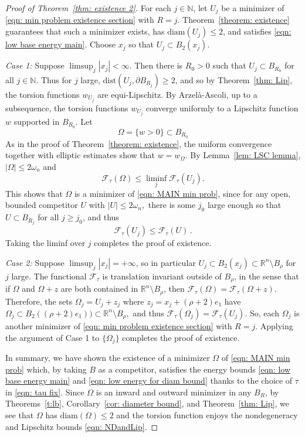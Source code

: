 \documentclass[10pt, reqno]{amsart}
\numberwithin{equation}{section}
\def\R{{\mathbb R}}
\def\W{\Omega}
\def\om{\omega}
\def\err{\tau}
\def\Ep{\mathcal{F}_{\err}}
\begin{document}
    \begin{proof}[Proof of Theorem~\ref{thm: existence 2}]
For each $j \in \mathbb{N}$, let $U_j$ be a minimizer of \eqref{eqn: min problem existence section} with $R =j.$ Theorem~\ref{theorem: existence} guarantees that such a minimizer exists, has  $\text{diam}(U_j)\leq 2$, and satisfies \eqref{eqn: low base energy main}. Choose $x_j$ so that $U_j \subset B_2(x_j).$

{\it Case 1:} Suppose $\limsup_j |x_j| <\infty$. Then there is  $R_0>0$ such that $U_j \subset B_{R_0}$ for all $j \in \mathbb{N}.$ Thus for $j$ large, $\text{dist}(U_j, \partial B_{R_j}) \geq 2$, and so by Theorem~\ref{thm: Lip}, the torsion functions $w_{U_j}$ are equi-Lipschitz. By Arzel\`{a}-Ascoli, up to a subsequence, the torsion functions $w_{U_j}$ converge uniformly to a Lipschitz function $w$ supported in $B_{R_0}$. Let 
\[
\W  =\{w>0\} \subset B_{R_0}
\]
 As in the proof of Theorem~\ref{theorem: existence}, the uniform convergence together with elliptic estimates show that $w= w_\W.$ By Lemma~\ref{lem: LSC lemma},  $|\W| \leq 2 \om_n$ and 
 \[
 \Ep(\W) \leq \liminf_j \Ep(U_j).
 \]
 This shows that $\W$ is a minimizer of \eqref{eqn: MAIN min prob}, since for any open, bounded competitor $U$ with $|U|\leq 2\om_n,$ there is some $j_0$ large enough so that $U \subset B_{R_j}$ for all $j \geq j_0$, and thus 
 \[
 \Ep(U_j) \leq \Ep(U)\,.
 \]
 Taking the liminf over $j$ completes the proof of existence.



 {\it Case 2:} Suppose $\limsup_j |x_j| = +\infty$, so  in particular $U_j \subset B_2(x_j) \subset \R^n \setminus B_\rho$  for $j$ large. The functional $\Ep$ is translation invariant outside of $B_\rho$, in the sense that if $\W$ and $\W + z$ are both contained in $\R^n \setminus B_\rho$, then $\Ep(\W) = \Ep(\W + z).$ Therefore, the sets $\W_j  = U_j + z_j$ where $z_j = x_j + (\rho + 2)e_1$ have $\W_j \subset B_2((\rho+2) e_1))\subset \R^n \setminus B_\rho,$ and thus $\Ep(\W_j ) = \Ep(U_j)$. So, each $\W_j$ is another minimizer of \eqref{eqn: min problem existence section} with $R =j$. Applying the argument of Case 1 to $\{ \W_j\}$ completes the proof of existence.


 In summary, we have shown the existence of a minimizer $\W$ of \eqref{eqn: MAIN min prob} which, by taking $B$ as a competitor, satisfies the energy bounds \eqref{eqn: low base energy main} and \eqref{eqn: low energy for diam bound} thanks to the choice of $\tau$ in \eqref{eqn: tau fix}. Since $\W$ is an inward and outward minimizer in any $B_R$, by Theorems~\ref{t:lb}, Corollary~\ref{cor: diameter bound}, and Theorem~\ref{thm: Lip}, we see that $\W$ has $\text{diam}(\W)\leq 2$ and the torsion function enjoys the nondegeneracy and Lipschitz bounds \eqref{eqn: NDandLip}.



\end{proof}
\end{document}
